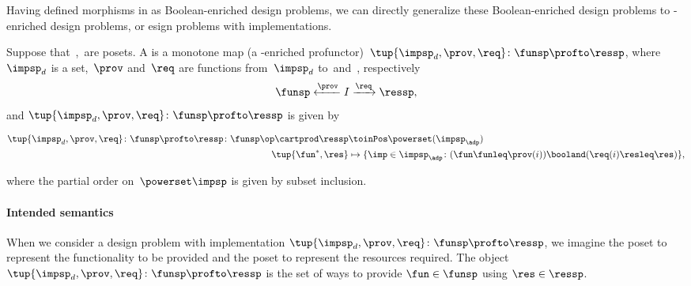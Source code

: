 {	Having defined morphisms in \DP as Boolean-enriched design problems, we can directly generalize these Boolean-enriched design problems to \Set-enriched design problems, or esign problems with implementations.
	\begin{widepar}
		\begin{definition}
			\label{def:dpwithimp}
			Suppose that~\funsp,~\ressp are posets.
			A \emph{} is a monotone map (a \Set-enriched profunctor)~$\tup{\impsp_d,\prov,\req}\colon \funsp\profto \ressp$, where~$\impsp_d$ is a set,~$\prov$ and~$\req$ are functions from~$\impsp_d$ to~\funsp and~\ressp, respectively
			\begin{equation*}
				\funsp \xleftarrow{\prov} I \xrightarrow{\req} \ressp,
			\end{equation*}
			and $\tup{\impsp_d,\prov,\req}\colon \funsp\profto \ressp$ is given by

			\begin{equation}
				\begin{aligned}
					\tup{\impsp_d,\prov,\req}\colon \funsp\profto \ressp \colon \funsp\op \cartprod \ressp & \toinPos \powerset(\impsp_\adp)                                                                     \\
					\tup{\fun^*, \res}                                                                     & \mapsto \{ \imp \in \impsp_\adp \colon ( \fun \funleq \prov(i)) \booland (\req(i) \resleq \res) \},
				\end{aligned}
			\end{equation}

			where the partial order on~$\powerset\impsp$ is given by subset inclusion.
		\end{definition}
	\end{widepar}

	\paragraph{Intended semantics}
	When we consider a design problem with implementation $\tup{\impsp_d, \prov, \req}\colon \funsp\profto \ressp$, we imagine the poset \funsp to represent the functionality to be provided and the poset \ressp to represent the resources required.
	The object $\tup{\impsp_d,\prov,\req}\colon \funsp\profto \ressp$ is the set of ways to provide $\fun\in \funsp$ using $\res\in \ressp$.

}
